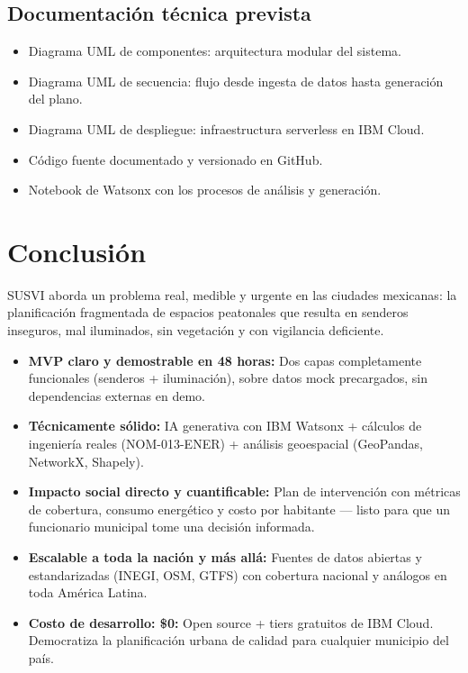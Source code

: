 \documentclass[12pt,a4paper]{article}
\begin{document}
\subsection{Documentación técnica prevista}

\begin{itemize}[leftmargin=1.5cm, itemsep=3pt]
  \item Diagrama UML de componentes: arquitectura modular del sistema.
  \item Diagrama UML de secuencia: flujo desde ingesta de datos hasta generación del plano.
  \item Diagrama UML de despliegue: infraestructura serverless en IBM Cloud.
  \item Código fuente documentado y versionado en GitHub.
  \item Notebook de Watsonx con los procesos de análisis y generación.
\end{itemize}


\newpage
\section{Conclusión}

SUSVI aborda un problema real, medible y urgente en las ciudades mexicanas: la planificación fragmentada de espacios peatonales que resulta en senderos inseguros, mal iluminados, sin vegetación y con vigilancia deficiente.

\begin{tcolorbox}[cajaazul, title=¿Por qué SUSVI gana?]
\begin{itemize}[leftmargin=0.5cm, itemsep=4pt]
  \item \textbf{MVP claro y demostrable en 48 horas:} Dos capas completamente funcionales (senderos + iluminación), sobre datos mock precargados, sin dependencias externas en demo.
  \item \textbf{Técnicamente sólido:} IA generativa con IBM Watsonx + cálculos de ingeniería reales (NOM-013-ENER) + análisis geoespacial (GeoPandas, NetworkX, Shapely).
  \item \textbf{Impacto social directo y cuantificable:} Plan de intervención con métricas de cobertura, consumo energético y costo por habitante — listo para que un funcionario municipal tome una decisión informada.
  \item \textbf{Escalable a toda la nación y más allá:} Fuentes de datos abiertas y estandarizadas (INEGI, OSM, GTFS) con cobertura nacional y análogos en toda América Latina.
  \item \textbf{Costo de desarrollo: \$0:} Open source + tiers gratuitos de IBM Cloud. Democratiza la planificación urbana de calidad para cualquier municipio del país.
\end{itemize}
\end{tcolorbox}
\end{document}
